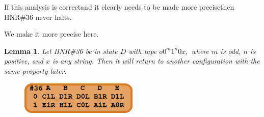 \documentclass[12pt]{article}
\newtheorem*{lemmastar}{Lemma}
\begin{document}
If this analysis is correct\textemdash and it clearly needs to be made more precise\textemdash then HNR\#36 never halts.

\newpage

We make it more precise here.
\begin{lemmastar}
Let HNR\#36 be in state $D$ with tape $o0^{m}1^{n}0x,$
where $m$ is odd, $n$ is positive, and $x$ is any string.
Then it will return to another configuration with the same property later.
\end{lemmastar}
\begin{figure}[H]
\centering
\includegraphics[width=0.5\textwidth]{HNR36.png}
\end{figure}
\end{document}
